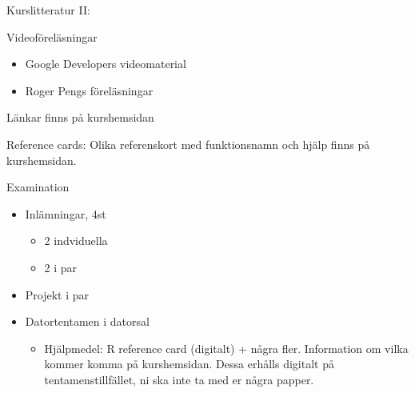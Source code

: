 \documentclass[
  10pt,
  ignorenonframetext,
]{beamer}
\providecommand{\tightlist}{%
  \setlength{\itemsep}{0pt}\setlength{\parskip}{0pt}}
\begin{document}
\begin{frame}{Kurslitteratur II:}
\protect\hypertarget{kurslitteratur-ii}{}
\begin{block}{Videoföreläsningar}
\protect\hypertarget{videofuxf6reluxe4sningar}{}
\begin{itemize}
\tightlist
\item
  Google Developers videomaterial
\item
  Roger Pengs föreläsningar
\end{itemize}

Länkar finns på kurshemsidan
\end{block}

\begin{block}{Reference cards:}
\protect\hypertarget{reference-cards}{}
Olika referenskort med funktionsnamn och hjälp finns på kurshemsidan.
\end{block}
\end{frame}

\begin{frame}{Examination}
\protect\hypertarget{examination}{}
\begin{itemize}
\tightlist
\item
  Inlämningar, 4st
  \begin{itemize}
  \tightlist
  \item 2 indviduella 
  \item 2 i par
  \end{itemize}
\item
  Projekt i par
\item
  Datortentamen i datorsal

  \begin{itemize}
  \tightlist
  \item
    Hjälpmedel: R reference card (digitalt) + några fler. Information om
    vilka kommer komma på kurshemsidan. Dessa erhålls digitalt på
    tentamenstillfället, ni ska inte ta med er några papper.
  \end{itemize}
\end{itemize}
\end{frame}
\end{document}
